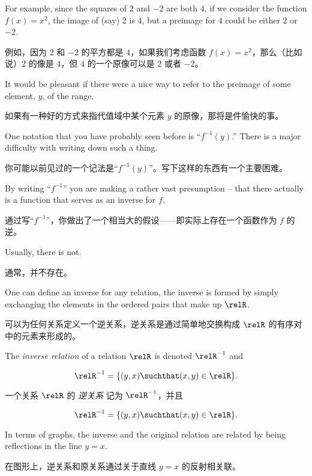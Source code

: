 For example, since the squares of $2$ and $-2$ are
both $4$, if we consider the function $f(x) = x^2$, the image of (say) $2$ 
is $4$, but a preimage for $4$ could be either $2$ or $-2$.

例如，因为 $2$ 和 $-2$ 的平方都是 $4$，如果我们考虑函数 $f(x) = x^2$，那么（比如说）$2$ 的像是 $4$，但 $4$ 的一个原像可以是 $2$ 或者 $-2$。

It would be pleasant if there were a nice way to refer to the preimage of
some element, $y$, of the range.

如果有一种好的方式来指代值域中某个元素 $y$ 的原像，那将是件愉快的事。

One notation that you have probably 
seen before is ``$f^{-1}(y)$.''  There is a major difficulty with writing 
down such a thing.

你可能以前见过的一个记法是“$f^{-1}(y)$”。写下这样的东西有一个主要困难。

By writing ``$f^{-1}$'' you are making a rather
vast presumption -- that there actually is a function that serves as an
inverse for $f$.

通过写“$f^{-1}$”，你做出了一个相当大的假设——即实际上存在一个函数作为 $f$ 的逆。

Usually, there is not.  

通常，并不存在。

One can define an inverse for any relation, the inverse is formed by
simply exchanging the elements in the ordered pairs that make up $\relR$.

可以为任何关系定义一个逆关系，逆关系是通过简单地交换构成 $\relR$ 的有序对中的元素来形成的。

\begin{defi}
The \emph{inverse relation} of a relation $\relR$
is denoted $\relR^{-1}$ and 

\[ \relR^{-1} = \{ (y,x) \suchthat (x,y) \in \relR \}. \]
\end{defi}

\begin{defi}
一个关系 $\relR$ 的 \emph{逆关系} 记为 $\relR^{-1}$，并且

\[ \relR^{-1} = \{ (y,x) \suchthat (x,y) \in \relR \}. \]
\end{defi}

In terms of graphs, the inverse and the original relation are related
by being reflections in the line $y=x$.

在图形上，逆关系和原关系通过关于直线 $y=x$ 的反射相关联。

